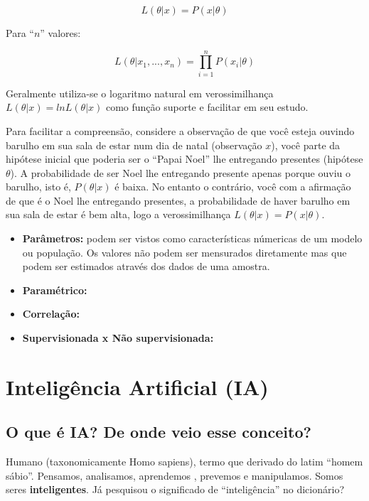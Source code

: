 \documentclass[
]{book}
\begin{document}
\begin{equation} 
 L(\theta |x)=P(x| \theta)
  \label{eq:fverossimilhanca}
\end{equation}

Para ``\(n\)'' valores:

\begin{equation} 
 L(\theta |x_1,..., x_n)=\prod_{i=1}^{n} P(x_i| \theta)
  \label{eq:fsumverossimilhanca}
\end{equation}

Geralmente utiliza-se o logaritmo natural em verossimilhança \(L(\theta |x)=ln L(\theta|x)\) como função suporte e facilitar em seu estudo.

Para facilitar a compreensão, considere a observação de que você esteja ouvindo barulho em sua sala de estar num dia de natal (observação \(x\)), você parte da hipótese inicial que poderia ser o ``Papai Noel'' lhe entregando presentes (hipótese \(\theta\)). A probabilidade de ser Noel lhe entregando presente apenas porque ouviu o barulho, isto é, \(P(\theta|x)\) é baixa. No entanto o contrário, você com a afirmação de que é o Noel lhe entregando presentes, a probabilidade de haver barulho em sua sala de estar é bem alta, logo a verossimilhança \(L(\theta|x)=P(x|\theta)\).

\begin{itemize}
\item
  \textbf{Parâmetros:} podem ser vistos como características númericas de um modelo ou população. Os valores não podem ser mensurados diretamente mas que podem ser estimados através dos dados de uma amostra.
\item
  \textbf{Paramétrico:}
\item
  \textbf{Correlação:}
\item
  \textbf{Supervisionada x Não supervisionada:}
\end{itemize}

\hypertarget{i-a}{%
\chapter{Inteligência Artificial (IA)}\label{i-a}}

\hypertarget{o-que-uxe9-ia-de-onde-veio-esse-conceito}{%
\section{O que é IA? De onde veio esse conceito?}\label{o-que-uxe9-ia-de-onde-veio-esse-conceito}}

Humano (taxonomicamente Homo sapiens), termo que derivado do latim ``homem sábio''. Pensamos, analisamos, aprendemos , prevemos e manipulamos. Somos seres \textbf{inteligentes}. Já pesquisou o significado de ``inteligência'' no dicionário?
\end{document}
